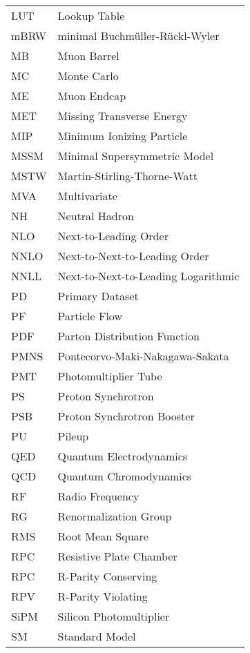 \begin{longtable}[l]{@{}l@{\ \ \ \ \ \ \ \ \ \ \ \ }l}
LUT        & Lookup Table \\
mBRW       & minimal Buchm\"{u}ller-R\"{u}ckl-Wyler \\
MB         & Muon Barrel \\
MC         & Monte Carlo \\
ME         & Muon Endcap \\
MET        & Missing Transverse Energy \\
MIP        & Minimum Ionizing Particle \\
MSSM       & Minimal Supersymmetric Model \\
MSTW       & Martin-Stirling-Thorne-Watt \\
MVA        & Multivariate \\
NH         & Neutral Hadron \\
NLO        & Next-to-Leading Order \\
NNLO       & Next-to-Next-to-Leading Order \\
NNLL       & Next-to-Next-to-Leading Logarithmic \\
PD         & Primary Dataset \\
PF         & Particle Flow \\
PDF        & Parton Distribution Function \\
PMNS       & Pontecorvo-Maki-Nakagawa-Sakata \\
PMT        & Photomultiplier Tube \\
PS         & Proton Synchrotron \\
PSB        & Proton Synchrotron Booster \\
PU         & Pileup \\
QED        & Quantum Electrodynamics \\
QCD        & Quantum Chromodynamics \\
RF         & Radio Frequency \\
RG         & Renormalization Group \\
RMS        & Root Mean Square \\
RPC        & Resistive Plate Chamber \\
RPC        & R-Parity Conserving \\
RPV        & R-Parity Violating \\
SiPM       & Silicon Photomultiplier \\
SM         & Standard Model \\

\end{longtable}
